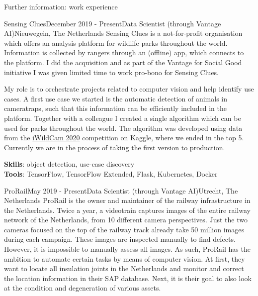 \begin{rSection}{Further information: work experience}
\begin{rSubsection}{Sensing Clues}{December 2019 - Present}{Data Scientist (through Vantage AI)}{Nieuwegein, The Netherlands}
Sensing Clues is a not-for-profit organisation which offers an analysis platform for wildlife parks throughout the world. 
Information is collected by rangers through an (offline) app, which connects to the platform.
I did the acquisition and as part of the Vantage for Social Good initiative I was given limited time to work pro-bono for Sensing Clues.

My role is to orchestrate projects related to computer vision and help identify use cases.
A first use case we started is the automatic detection of animals in cameratraps, such that this information can be efficiently included in the platform.
Together with a colleague I created a single algorithm which can be used for parks throughout the world. 
The algorithm was developed using data from the \href{https://www.kaggle.com/c/iwildcam-2020-fgvc7/leaderboard}{iWildCam 2020} competition on Kaggle,
where we ended in the top 5.
Currently we are in the process of taking the first version to production.

{\bf Skills}: object detection, use-case discovery\\
{\bf Tools}: TensorFlow, TensorFlow Extended, Flask, Kubernetes, Docker
\end{rSubsection}

\begin{rSubsection}{ProRail}{May 2019 - Present}{Data Scientist (through Vantage AI)}{Utrecht, The Netherlands}
ProRail is the owner and maintainer of the railway infrastructure in the Netherlands.
Twice a year, a videotrain captures images of the entire railway network of the Netherlands, from 10 different 
camera perspectives. 
Just the two cameras focused on the top of the railway track already take 50 million images during each campaign.
These images are inspected manually to find defects. However, it is impossible to manually assess all images.
As such, ProRail has the ambition to automate certain tasks by means of computer vision.
At first, they want to locate all insulation joints in the Netherlands and monitor and correct the location information in
their SAP database. Next, it is their goal to also look at the condition and degeneration of various assets.


\end{rSubsection}
\end{rSection}

